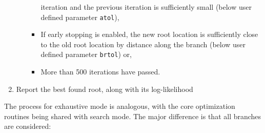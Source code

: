 \documentclass{article}
\begin{document}
\begin{enumerate}
\begin{enumerate}
\begin{itemize}
                        iteration and the previous iteration is sufficiently
                        small (below user defined parameter \texttt{atol}),
                  \item If early stopping is enabled, the new root location is
                    sufficiently close to the old root location by distance
                    along the branch (below user defined parameter
                    \texttt{brtol}) or,
                  \item More than 500 iterations have passed.
                \end{itemize}
        \end{enumerate}
  \item Report the best found root, along with its log-likelihood
\end{enumerate}

The process for exhaustive mode is analogous, with the core optimization routines
being shared with search mode. The major difference is that all branches are
considered:
\end{document}
